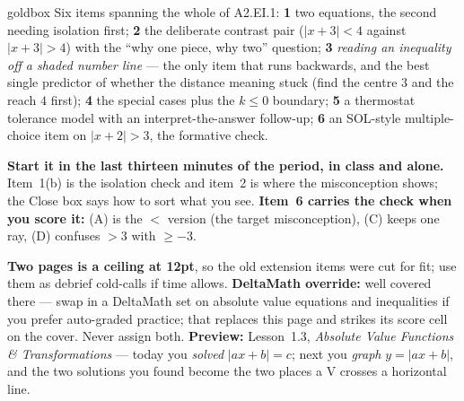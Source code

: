\documentclass[10pt]{article}
\begin{document}
\boxguard
\begin{skillbox}{goldbox}
Six items spanning the whole of A2.EI.1: \textbf{1} two equations, the second needing isolation
first; \textbf{2} the deliberate contrast pair ($|x+3|<4$ against $|x+3|>4$) with the ``why one
piece, why two'' question; \textbf{3} \emph{reading an inequality off a shaded number line} ---
the only item that runs backwards, and the best single predictor of whether the distance meaning
stuck (find the centre $3$ and the reach $4$ first); \textbf{4} the special cases plus the
$k\le0$ boundary; \textbf{5} a thermostat tolerance model with an interpret-the-answer follow-up;
\textbf{6} an SOL-style multiple-choice item on $|x+2|>3$, the formative check.

\textbf{Start it in the last thirteen minutes of the period, in class and alone.} Item~1(b) is the
isolation check and item~2 is where the misconception shows; the Close box says how to sort what
you see. \textbf{Item~6 carries the check when you score it:} (A) is the $<$ version (the target
misconception), (C) keeps one ray, (D) confuses $>3$ with $\ge-3$.

\textbf{Two pages is a ceiling at 12pt}, so the old extension items were cut for fit; use
them as debrief cold-calls if time allows. \textbf{DeltaMath override:} well covered
there --- swap in a DeltaMath set on absolute value equations and inequalities if you prefer
auto-graded practice; that replaces this page and strikes its score cell on the cover. Never
assign both. \textbf{Preview:} Lesson~1.3, \emph{Absolute Value Functions \& Transformations} ---
today you \emph{solved} $|ax+b|=c$; next you \emph{graph} $y=|ax+b|$, and the two solutions you
found become the two places a V crosses a horizontal line.
\end{skillbox}
\end{document}
